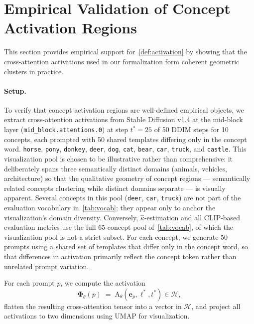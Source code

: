 \section{Empirical Validation of Concept Activation Regions}
\label{app:activation_regions}
This section provides empirical support for~\cref{def:activation} by showing that the cross-attention activations used in our formalization form coherent geometric clusters in practice.
\paragraph{Setup.}
To verify that concept activation regions are well-defined empirical objects, we extract cross-attention activations from Stable Diffusion v1.4 at the mid-block layer (\texttt{mid\_block.attentions.0}) at step $t^*{=}25$ of 50 DDIM steps for 10 concepts, each prompted with 50 shared templates differing only in the concept word.
\texttt{horse}, \texttt{pony}, \texttt{donkey}, \texttt{deer}, \texttt{dog}, \texttt{cat}, \texttt{bear}, \texttt{car}, \texttt{truck}, and \texttt{castle}.
This visualization pool is chosen to be illustrative rather than comprehensive: it deliberately spans three semantically distinct domains (animals, vehicles, architecture) so that the qualitative geometry of concept regions --- semantically related concepts clustering while distinct domains separate --- is visually apparent. Several concepts in this pool (\texttt{deer}, \texttt{car}, \texttt{truck}) are not part of the evaluation vocabulary in~\cref{tab:vocab}; they appear only to anchor the visualization's domain diversity. Conversely, $\hat\kappa$-estimation and all CLIP-based evaluation metrics use the full $65$-concept pool of~\cref{tab:vocab}, of which the visualization pool is not a strict subset.
For each concept, we generate 50 prompts using a shared set of templates that differ only in the concept word, so that differences in activation primarily reflect the concept token rather than unrelated prompt variation.

For each prompt $p$, we compute the activation
\begin{equation}
    \boldsymbol{\Phi}_{\theta}(p) \;=\; \mathrm{A}_{\theta}(\mathbf{e}_p,\ell^*,t^*) \in \mathcal{H},
\end{equation}
flatten the resulting cross-attention tensor into a vector in $\mathcal{H}$, and project all activations to two dimensions using UMAP for visualization.

